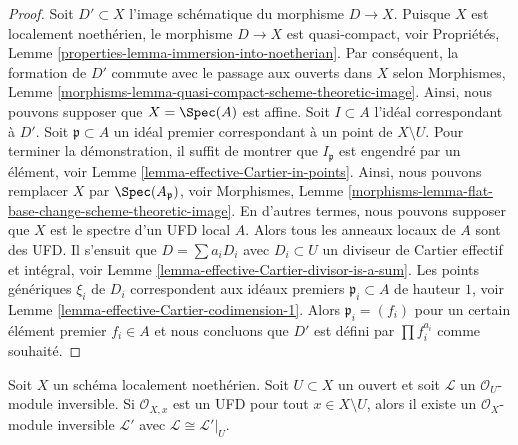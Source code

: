 \begin{proof}
Soit  $D' \subset X$  l'image schématique du morphisme  $D \to X$. Puisque
 $X$  est localement noethérien, le morphisme  $D \to X$  est
quasi-compact, voir Propriétés, Lemme  \ref{properties-lemma-immersion-into-noetherian}. Par conséquent, la formation
de  $D'$  commute avec le passage aux ouverts dans  $X$  selon
Morphismes, Lemme  \ref{morphisms-lemma-quasi-compact-scheme-theoretic-image}. Ainsi, nous pouvons supposer que  $X = \Spec(A)$  est
affine. Soit  $I \subset A$  l'idéal correspondant à  $D'$. Soit  $\mathfrak p \subset A$ 
un idéal premier correspondant à un point de  $X \setminus U$. Pour terminer la
démonstration, il suffit de montrer que  $I_\mathfrak p$  est engendré par un élément,
voir Lemme  \ref{lemma-effective-Cartier-in-points}. Ainsi, nous pouvons remplacer  $X$  par
 $\Spec(A_\mathfrak p)$, voir Morphismes, Lemme  \ref{morphisms-lemma-flat-base-change-scheme-theoretic-image}. En d'autres termes, nous
pouvons supposer que  $X$  est le spectre d'un UFD local  $A$.
Alors tous les anneaux locaux de  $A$  sont des UFD. Il s'ensuit que
 $D = \sum a_i D_i$  avec  $D_i \subset U$  un diviseur de Cartier effectif et intégral, voir
Lemme  \ref{lemma-effective-Cartier-divisor-is-a-sum}. Les points génériques  $\xi_i$  de  $D_i$ 
correspondent aux idéaux premiers  $\mathfrak p_i \subset A$  de hauteur  $1$, voir Lemme
 \ref{lemma-effective-Cartier-codimension-1}. Alors  $\mathfrak p_i = (f_i)$  pour un certain élément premier  $f_i \in A$  et
nous concluons que  $D'$  est défini par  $\prod f_i^{a_i}$  comme souhaité.
\end{proof}

\begin{lemma}
\label{lemma-extend-invertible-module}
Soit  $X$  un schéma localement noethérien. Soit  $U \subset X$  un ouvert et
soit  $\mathcal{L}$  un  $\mathcal{O}_U$-module inversible. Si  $\mathcal{O}_{X, x}$  est un UFD
pour tout  $x \in X \setminus U$, alors il existe un  $\mathcal{O}_X$-module inversible
 $\mathcal{L}'$  avec  $\mathcal{L} \cong \mathcal{L}'|_U$.
\end{lemma}


